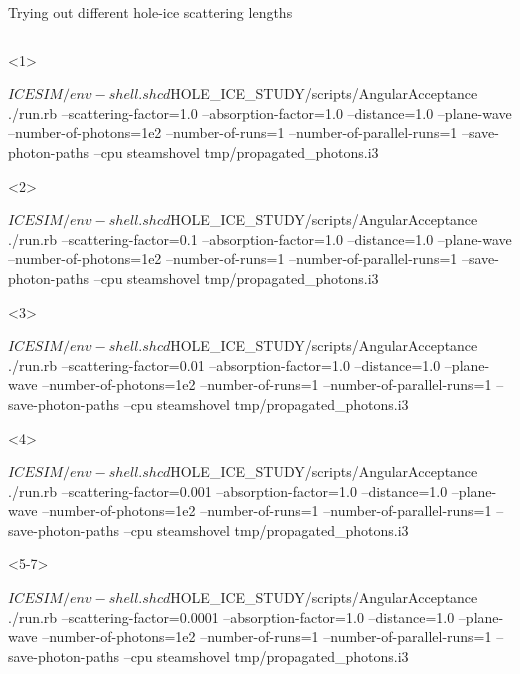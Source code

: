 \begin{frame}[fragile]{Trying out different hole-ice scattering lengths}
\begin{columns}
\begin{column}{0.5\textwidth}
      \begin{onlyenv}<1>
        \begin{smallbash}
          $ICESIM/env-shell.sh
          cd $HOLE_ICE_STUDY/scripts/AngularAcceptance
          ./run.rb --scattering-factor=1.0 --absorption-factor=1.0 --distance=1.0 --plane-wave --number-of-photons=1e2 --number-of-runs=1 --number-of-parallel-runs=1 --save-photon-paths --cpu
          steamshovel tmp/propagated_photons.i3
        \end{smallbash}
      \end{onlyenv}

      \begin{onlyenv}<2>
        \begin{smallbash}
          $ICESIM/env-shell.sh
          cd $HOLE_ICE_STUDY/scripts/AngularAcceptance
          ./run.rb --scattering-factor=0.1 --absorption-factor=1.0 --distance=1.0 --plane-wave --number-of-photons=1e2 --number-of-runs=1 --number-of-parallel-runs=1 --save-photon-paths --cpu
          steamshovel tmp/propagated_photons.i3
        \end{smallbash}
      \end{onlyenv}

      \begin{onlyenv}<3>
        \begin{smallbash}
          $ICESIM/env-shell.sh
          cd $HOLE_ICE_STUDY/scripts/AngularAcceptance
          ./run.rb --scattering-factor=0.01 --absorption-factor=1.0 --distance=1.0 --plane-wave --number-of-photons=1e2 --number-of-runs=1 --number-of-parallel-runs=1 --save-photon-paths --cpu
          steamshovel tmp/propagated_photons.i3
        \end{smallbash}
      \end{onlyenv}

      \begin{onlyenv}<4>
        \begin{smallbash}
          $ICESIM/env-shell.sh
          cd $HOLE_ICE_STUDY/scripts/AngularAcceptance
          ./run.rb --scattering-factor=0.001 --absorption-factor=1.0 --distance=1.0 --plane-wave --number-of-photons=1e2 --number-of-runs=1 --number-of-parallel-runs=1 --save-photon-paths --cpu
          steamshovel tmp/propagated_photons.i3
        \end{smallbash}
      \end{onlyenv}

      \begin{onlyenv}<5-7>
        \begin{smallbash}
          $ICESIM/env-shell.sh
          cd $HOLE_ICE_STUDY/scripts/AngularAcceptance
          ./run.rb --scattering-factor=0.0001 --absorption-factor=1.0 --distance=1.0 --plane-wave --number-of-photons=1e2 --number-of-runs=1 --number-of-parallel-runs=1 --save-photon-paths --cpu
          steamshovel tmp/propagated_photons.i3
        \end{smallbash}
      \end{onlyenv}


\end{column}
\end{columns}
\end{frame}
